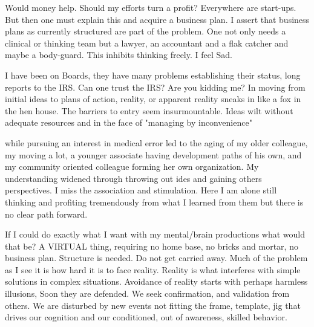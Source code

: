 \par{}
Would money help. Should my efforts turn a profit? Everywhere are start-ups. But then one must explain this and acquire a business plan. I assert that business plans as currently structured are part of the problem. One not only needs a clinical or thinking team but a lawyer, an accountant and a flak catcher and maybe a body-guard. This inhibits thinking freely. I feel Sad.

\par{}
I have been on Boards, they have many problems establishing their status, long reports to the IRS. Can one trust the IRS?  Are you kidding me? In moving from initial ideas to plans of action, reality, or apparent reality sneaks in like a fox in the hen house. The barriers to entry seem insurmountable. Ideas wilt without adequate resources and in the face of "managing by inconvenience" 
\pagebreak
\par{} while pursuing an interest in medical error led to the aging of my older colleague, my moving a lot, a younger associate having development paths of his own, and my community oriented colleague forming her own organization. My understanding widened through throwing out ides and gaining others perspectives. I miss the association and stimulation. Here I am alone still thinking and profiting tremendously from what I learned from them but there is no clear path forward.

\par{}If I could do exactly what I want with my mental/brain productions what would that be? A VIRTUAL thing, requiring no home base, no bricks and mortar, no business plan. Structure is needed. Do not get carried away. Much of the problem as I see it is how hard it is to face reality. Reality is what interferes with simple solutions in complex situations. Avoidance of reality starts with perhaps harmless illusions, Soon they are defended. We seek confirmation, and validation from others. 
We are disturbed by new events not fitting the frame, template, jig that drives our cognition and our conditioned, out of awareness, skilled behavior. 

%